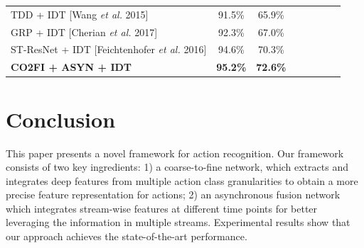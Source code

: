 \documentclass[letterpaper]{article} %
\begin{document}
\begin{table}
{\begin{tabular}{|p{5.3cm}|c|*{5}{c|}c}
TDD + IDT [Wang \emph{et al.} 2015]&  91.5\%& 65.9\%\\
GRP + IDT [Cherian \emph{et al.} 2017]&  92.3\%& 67.0\%\\
ST-ResNet + IDT [Feichtenhofer \emph{et al.} 2016]&  94.6\%& 70.3\%\\
{\bf CO2FI + ASYN + IDT}& {\bf 95.2\%}& {\bf 72.6\%}  \\
\hline
\end{tabular}}
\end{table}





\section{Conclusion\label{section:conclusion}}


This paper presents a novel framework for action recognition. Our framework consists of two key ingredients: 1) a coarse-to-fine network, which extracts and integrates deep features from multiple action class
granularities to obtain a more precise feature representation for actions; 2) an asynchronous fusion network which integrates stream-wise features at different time points
for better leveraging the information in multiple streams.
Experimental results show that our approach achieves the state-of-the-art performance.





\end{document}

